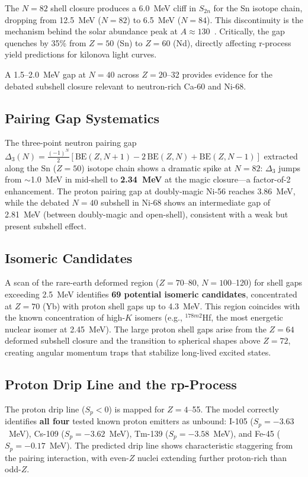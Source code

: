 \documentclass[twocolumn,letterpaper,10pt]{article}
\begin{document}
The $N=82$ shell closure produces a 6.0~MeV cliff in $S_{2n}$ for the Sn
isotope chain, dropping from 12.5~MeV ($N=82$) to 6.5~MeV ($N=84$). This
discontinuity is the mechanism behind the solar abundance peak at
$A \approx 130$~\cite{cowan2021}. Critically, the gap quenches by 35\%
from $Z=50$ (Sn) to $Z=60$ (Nd), directly affecting r-process yield
predictions for kilonova light curves.

A 1.5--2.0~MeV gap at $N=40$ across $Z=20$--32 provides evidence for
the debated subshell closure relevant to neutron-rich Ca-60 and Ni-68.

\subsection{Pairing Gap Systematics}

The three-point neutron pairing gap $\Delta_3(N) = \tfrac{(-1)^N}{2}
[\text{BE}(Z,N{+}1) - 2\,\text{BE}(Z,N) + \text{BE}(Z,N{-}1)]$ extracted
along the Sn ($Z=50$) isotope chain shows a dramatic spike at $N=82$:
$\Delta_3$ jumps from $\sim$1.0~MeV in mid-shell to \textbf{2.34~MeV} at
the magic closure---a factor-of-2 enhancement. The proton pairing gap at
doubly-magic Ni-56 reaches 3.86~MeV, while the debated $N=40$ subshell in
Ni-68 shows an intermediate gap of 2.81~MeV (between doubly-magic and
open-shell), consistent with a weak but present subshell effect.

\subsection{Isomeric Candidates}

A scan of the rare-earth deformed region ($Z=70$--80, $N=100$--120) for
shell gaps exceeding 2.5~MeV identifies \textbf{69 potential isomeric
candidates}, concentrated at $Z=70$ (Yb) with proton shell gaps up to
4.3~MeV. This region coincides with the known concentration of
high-$K$ isomers (e.g., $^{178m2}$Hf, the most energetic nuclear isomer
at 2.45~MeV). The large proton shell gaps arise from the $Z=64$ deformed
subshell closure and the transition to spherical shapes above $Z=72$,
creating angular momentum traps that stabilize long-lived excited states.

\subsection{Proton Drip Line and the rp-Process}

The proton drip line ($S_p < 0$) is mapped for $Z=4$--55. The model
correctly identifies \textbf{all four} tested known proton emitters as unbound:
I-105 ($S_p = -3.63$~MeV), Cs-109 ($S_p = -3.62$~MeV), Tm-139
($S_p = -3.58$~MeV), and Fe-45 ($S_p = -0.17$~MeV). The predicted
drip line shows characteristic staggering from the pairing interaction,
with even-$Z$ nuclei extending further proton-rich than odd-$Z$.
\end{document}
